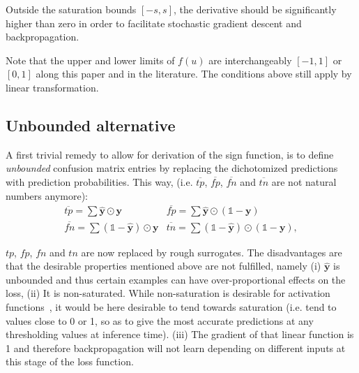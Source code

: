 Outside the saturation bounds $[-s, s]$, the derivative should be significantly higher than zero in order to facilitate stochastic gradient descent and backpropagation.

Note that the upper and lower limits of $f(u)$ are interchangeably $[-1,1]$ or $[0,1]$ along this paper and in the literature. The conditions above still apply by linear transformation.

\subsection{Unbounded alternative}
\label{subsec:unbounded}

A first trivial remedy to allow for derivation of the sign function, is to define \emph{unbounded} confusion matrix entries by replacing the dichotomized predictions with prediction probabilities. This way,
 (i.e. \(\overline{tp}\), \(\overline{fp}\), \(\overline{fn}\) and  \(\overline{tn}\) are not natural numbers anymore):
%
\begin{equation}
\label{eq:unbounded}
\begin{array}{ll} \overline{\mathit{tp}} = \sum \hat{\mathbf{y}} \odot \mathbf{y}  & \overline{\mathit{fp}} = \sum \hat{\mathbf{y}} \odot (\mathds{1} - \mathbf{y}) \\[.5em] \overline{\mathit{fn}} = \sum (\mathds{1} - \hat{\mathbf{y}}) \odot \mathbf{y} & \overline{\mathit{tn}} = \sum (\mathds{1} - \hat{\mathbf{y}}) \odot (\mathds{1} - \mathbf{y}),
\end{array}
\end{equation}
%

\(tp\), \(fp\), \(fn\) and \(tn\) are now replaced by rough surrogates. The disadvantages are that the desirable properties mentioned above are not fulfilled, namely (i) \(\hat{\mathbf{y}}\) is unbounded and thus certain examples can have over-proportional effects on the loss, (ii) It is non-saturated. While non-saturation is desirable for activation functions~\cite{saturation}, it would be here desirable to tend towards saturation (i.e. tend to values close to 0 or 1, so as to give the most accurate predictions at any thresholding values at inference time). (iii) The gradient of that linear function is 1 and therefore backpropagation will not learn depending on different inputs at this stage of the loss function.

